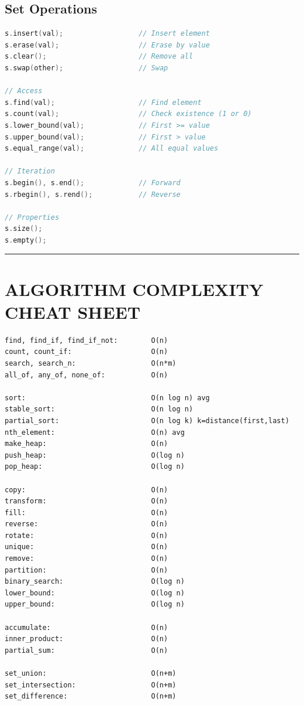 \hypertarget{set-operations}{%
\subsection{Set Operations}\label{set-operations}}

\begin{lstlisting}[language={C++}]
s.insert(val);                  // Insert element
s.erase(val);                   // Erase by value
s.clear();                      // Remove all
s.swap(other);                  // Swap

// Access
s.find(val);                    // Find element
s.count(val);                   // Check existence (1 or 0)
s.lower_bound(val);             // First >= value
s.upper_bound(val);             // First > value
s.equal_range(val);             // All equal values

// Iteration
s.begin(), s.end();             // Forward
s.rbegin(), s.rend();           // Reverse

// Properties
s.size();
s.empty();
\end{lstlisting}

\begin{center}\rule{0.5\linewidth}{0.5pt}\end{center}

\hypertarget{algorithm-complexity-cheat-sheet}{%
\section{ALGORITHM COMPLEXITY CHEAT
SHEET}\label{algorithm-complexity-cheat-sheet}}

\begin{lstlisting}
find, find_if, find_if_not:        O(n)
count, count_if:                   O(n)
search, search_n:                  O(n*m)
all_of, any_of, none_of:           O(n)

sort:                              O(n log n) avg
stable_sort:                       O(n log n)
partial_sort:                      O(n log k) k=distance(first,last)
nth_element:                       O(n) avg
make_heap:                         O(n)
push_heap:                         O(log n)
pop_heap:                          O(log n)

copy:                              O(n)
transform:                         O(n)
fill:                              O(n)
reverse:                           O(n)
rotate:                            O(n)
unique:                            O(n)
remove:                            O(n)
partition:                         O(n)
binary_search:                     O(log n)
lower_bound:                       O(log n)
upper_bound:                       O(log n)

accumulate:                        O(n)
inner_product:                     O(n)
partial_sum:                       O(n)

set_union:                         O(n+m)
set_intersection:                  O(n+m)
set_difference:                    O(n+m)
\end{lstlisting}

